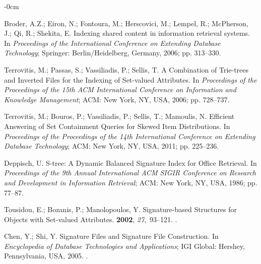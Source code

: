 \documentclass[algorithms,article,accept,pdftex,moreauthors]{Definitions/mdpi}
\begin{document}
\begin{adjustwidth}{-\extralength}{0cm}
\begin{thebibliography}{999}
Broder, A.Z.; Eiron, N.; Fontoura, M.; Herscovici, M.; Lempel, R.; McPherson,
  J.; Qi, R.; Shekita, E.
\newblock Indexing shared content in information retrieval systems.
\newblock In \emph{Proceedings of the International Conference on Extending Database
  Technology}; Springer: Berlin/Heidelberg, Germany, %
  2006; pp. 313--330.

Terrovitis, M.; Passas, S.; Vassiliadis, P.; Sellis, T.
\newblock A Combination of Trie-trees and Inverted Files for the Indexing of
  Set-valued Attributes.
\newblock In \emph{Proceedings of the Proceedings of the 15th ACM International
  Conference on Information and Knowledge Management}; ACM: New York, NY, USA,
  2006; pp. 728--737.

Terrovitis, M.; Bouros, P.; Vassiliadis, P.; Sellis, T.; Mamoulis, N.
\newblock Efficient Answering of Set Containment Queries for Skewed Item
  Distributions.
\newblock In \emph{Proceedings of the Proceedings of the 14th International
  Conference on Extending Database Technology}; ACM: New York, NY, USA,  2011;
   pp. 225--236.

Deppisch, U. %
\newblock S-tree: A Dynamic Balanced Signature Index for Office Retrieval.
\newblock In \emph{Proceedings of the 9th Annual International ACM
  SIGIR Conference on Research and Development in Information Retrieval}; ACM:
  New York, NY, USA,  1986;  pp. 77--87.

Tousidou, E.; Bozanis, P.; Manolopoulos, Y.
\newblock Signature-based Structures for Objects with Set-valued Attributes.
 {\bf 2002}, {\em 27},~93--121.
.

Chen, Y.; Shi, Y.
\newblock Signature Files and Signature File Construction.
\newblock In {\em Encyclopedia of Database Technologies and Applications}; IGI Global: Hershey, Pennsylvania, USA, %
 {2005}.
.


\end{thebibliography}
\end{adjustwidth}
\end{document}
